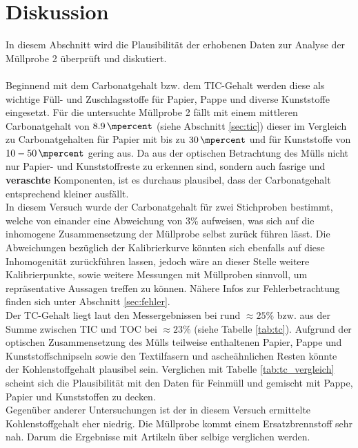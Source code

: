 \chapter{Diskussion}
\label{sec:diskussion}

In diesem Abschnitt wird die Plausibilität der erhobenen Daten zur Analyse der Müllprobe 2 überprüft und diskutiert.\\ \\
Beginnend mit dem Carbonatgehalt bzw. dem TIC-Gehalt werden diese als wichtige Füll- und Zuschlagsstoffe für Papier, Pappe und diverse Kunststoffe eingesetzt. Für die untersuchte Müllprobe 2 fällt mit einem mittleren Carbonatgehalt von $\SI{8.9}{\mpercent}$ (siehe Abschnitt \ref{sec:tic}) dieser im Vergleich zu Carbonatgehalten für Papier mit bis zu $\SI{30}{\mpercent}$ \cite{Wikipedia.21.11.2019} und für Kunststoffe von $10 - \SI{50}{\mpercent}$ \cite{PolymerServiceGmbHMerseburg.13.08.2019} gering aus. Da aus der optischen Betrachtung des Mülls nicht nur Papier- und Kunststoffreste zu erkennen sind, sondern auch fasrige und \textbf{ veraschte} Komponenten, ist es durchaus plausibel, dass der Carbonatgehalt entsprechend kleiner ausfällt. \\
In diesem Versuch wurde der Carbonatgehalt für zwei Stichproben bestimmt, welche von einander eine Abweichung von 3\% aufweisen, was sich auf die inhomogene Zusammensetzung der Müllprobe selbst zurück führen lässt.\linebreak
Die Abweichungen bezüglich der Kalibrierkurve könnten sich ebenfalls auf diese Inhomogenität zurückführen lassen, jedoch wäre an dieser Stelle weitere Kalibrierpunkte, sowie weitere Messungen mit Müllproben sinnvoll, um repräsentative Aussagen treffen zu können. Nähere Infos zur Fehlerbetrachtung finden sich unter Abschnitt \ref{sec:fehler}.\\

Der TC-Gehalt liegt laut den Messergebnissen bei rund $\approx 25\%$ bzw. aus der Summe zwischen TIC und TOC bei  $\approx 23\%$ (siehe Tabelle \ref{tab:tc}). Aufgrund der optischen Zusammensetzung des Mülls teilweise enthaltenen Papier, Pappe und Kunststoffschnipseln sowie den Textilfasern und ascheähnlichen Resten könnte der Kohlenstoffgehalt plausibel sein. Verglichen mit Tabelle \ref{tab:tc_vergleich} \cite[S.13]{HansGunterRamke.} scheint sich die Plausibilität mit den Daten für Feinmüll und gemischt mit Pappe, Papier und Kunststoffen zu decken.\\
Gegenüber anderer Untersuchungen ist der in diesem Versuch ermittelte Kohlenstoffgehalt eher niedrig\cite{Schwarzböck2018}. Die Müllprobe kommt einem Ersatzbrennstoff sehr nah. Darum die Ergebnisse mit Artikeln über selbige verglichen werden.


